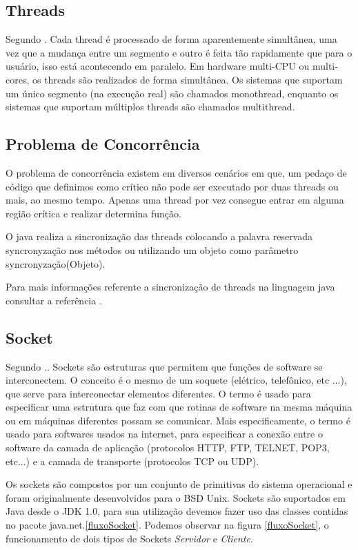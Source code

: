 \documentclass[12pt]{article}
\begin{document}
\subsection{Threads}
Segundo \cite{thred}. Cada thread é processado de forma aparentemente simultânea, uma vez que a mudança entre um segmento e outro é feita tão rapidamente que para o usuário, isso está acontecendo em paralelo. Em hardware multi-CPU ou multi-cores, os threads são realizados de forma simultânea.
Os sistemas que suportam um único segmento (na execução real) são chamados monothread, enquanto os sistemas que suportam múltiplos threads são chamados multithread.

\subsection{Problema de Concorrência}
O problema de concorrência existem em diversos cenários em que, um pedaço de código que definimos como crítico não pode ser executado por duas threads ou mais, ao mesmo tempo. Apenas uma thread por vez consegue entrar em alguma região crítica e realizar determina função.

O java realiza a sincronização das threads colocando a palavra reservada syncronyzação nos métodos ou utilizando um objeto como parâmetro syncronyzação(Objeto).

	
Para mais informações referente a sincronização de threads na linguagem java consultar a referência \cite{ct}.

 
\subsection{Socket}

 Segundo \cite{socket}.\cite{conc}.
 Sockets são estruturas que permitem que funções de software se interconectem. O conceito
 é o mesmo de um soquete (elétrico, telefônico, etc ...), que serve para interconectar
 elementos diferentes. O termo é usado para especificar uma estrutura que faz com que
 rotinas de software na mesma máquina ou em máquinas diferentes possam se comunicar.
 Mais especificamente, o termo é usado para softwares usados na internet, para especificar a
 conexão entre o software da camada de aplicação (protocolos HTTP, FTP, TELNET,
 POP3, etc...) e a camada de transporte (protocolos TCP ou UDP).
 
 Os sockets são compostos por um conjunto de primitivas do sistema operacional e foram originalmente desenvolvidos para o BSD Unix. Sockets são suportados em Java desde o JDK 1.0, para sua utilização devemos fazer uso das classes contidas no pacote java.net.\ref{fluxoSocket}. Podemos observar na figura \ref{fluxoSocket}, o funcionamento de dois tipos de Sockets  \textit{Servidor} e \textit{Cliente}.
 
\end{document}
